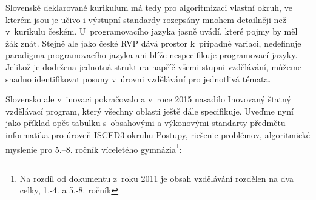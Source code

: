 \documentclass[FP,DP]{tulthesis}
\begin{document}
{{{\begin{table}[t]
\begin{tabular}{|l|l|}
\\\hline
\end{tabular}
\end{table}
 Slovenské deklarované kurikulum má tedy pro algoritmizaci vlastní okruh, ve kterém jsou je učivo i výstupní standardy rozepsány mnohem detailněji než v~kurikulu českém. U~programovacího jazyka jasně uvádí, které pojmy by měl žák znát. Stejně ale jako české RVP dává prostor k~případné variaci, nedefinuje paradigma programovacího jazyka ani blíže nespecifikuje programovací jazyky. Jelikož je dodržena jednotná struktura napříč všemi stupni vzdělávání, můžeme snadno identifikovat posuny  v~úrovni vzdělávání pro jednotlivá témata. \citep[s.~85]{berki2016}

Slovensko ale v~inovaci pokračovalo a v~roce 2015 nasadilo Inovovaný štatný vzdělávací program, který všechny oblasti ještě dále specifikuje.   Uveďme nyní jako příklad opět  tabulku s~obsahovými a výkonovými standarty předmětu informatika pro úroveň ISCED3 okruhu  Postupy, riešenie problémov, algoritmické myslenie pro 5.--8. ročník víceletého gymnázia\footnote{Na rozdíl od dokumentu z~roku 2011 je obsah vzdělávání rozdělen na dva celky, 1.-4. a 5.-8. ročník}:







}}}
\end{document}
